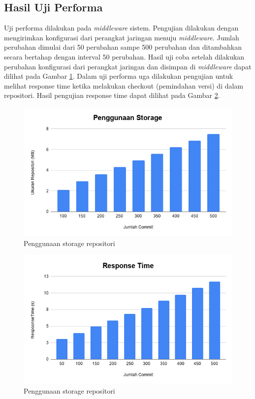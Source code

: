    	
    \subsection{Hasil Uji Performa}
    Uji performa dilakukan pada \textit{middleware} sistem. Pengujian dilakukan dengan mengirimkan konfigurasi dari perangkat jaringan menuju \textit{middleware}. Jumlah perubahan dimulai dari 50 perubahan sampe 500 perubahan dan ditambahkan secara bertahap dengan interval 50 perubahan. Hasil uji coba setelah dilakukan perubahan konfigurasi dari perangkat jaringan dan disimpan di \textit{middleware} dapat dilihat pada Gambar \ref{ukuranRepo}. Dalam uji performa uga dilakukan pengujian untuk melihat response time ketika melakukan checkout (pemindahan versi) di dalam repositori. Hasil pengujian response time dapat dilihat pada Gambar \ref{response time checkout}.
    	
    	\begin{figure}[H]
    	\centering
    	\includegraphics[width=\textwidth]{Images/C-5/Penggunaan-Storage.png}
    	\caption{Penggunaan storage repositori}
    	\label{ukuranRepo}
    	\end{figure}
    
    
    \begin{figure}[H]
    	\centering
    	\includegraphics[width=\textwidth]{Images/C-5/Response-Time.png}
    	\caption{Penggunaan storage repositori}
    	\label{response time checkout}
    \end{figure}
    
